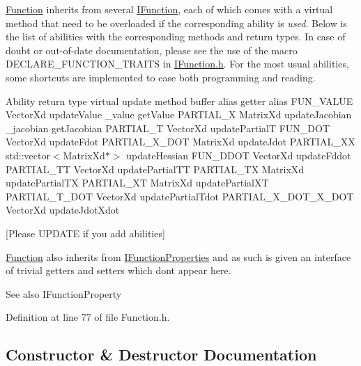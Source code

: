 \hyperlink{classocra_1_1Function}{Function} inherits from several \hyperlink{classocra_1_1IFunction}{I\+Function}, each of which comes with a virtual method that need to be overloaded if the corresponding ability is {\itshape used}. Below is the list of abilities with the corresponding methods and return types. In case of doubt or out-\/of-\/date documentation, please see the use of the macro D\+E\+C\+L\+A\+R\+E\+\_\+\+F\+U\+N\+C\+T\+I\+O\+N\+\_\+\+T\+R\+A\+I\+TS in \hyperlink{IFunction_8h}{I\+Function.\+h}. For the most usual abilities, some shortcuts are implemented to ease both programming and reading.

Ability return type virtual update method buffer alias getter alias F\+U\+N\+\_\+\+V\+A\+L\+UE Vector\+Xd update\+Value \+\_\+value get\+Value P\+A\+R\+T\+I\+A\+L\+\_\+X Matrix\+Xd update\+Jacobian \+\_\+jacobian get\+Jacobian P\+A\+R\+T\+I\+A\+L\+\_\+T Vector\+Xd update\+PartialT F\+U\+N\+\_\+\+D\+OT Vector\+Xd update\+Fdot P\+A\+R\+T\+I\+A\+L\+\_\+\+X\+\_\+\+D\+OT Matrix\+Xd update\+Jdot P\+A\+R\+T\+I\+A\+L\+\_\+\+XX std\+::vector$<$\+Matrix\+Xd$\ast$$>$ update\+Hessian F\+U\+N\+\_\+\+D\+D\+OT Vector\+Xd update\+Fddot P\+A\+R\+T\+I\+A\+L\+\_\+\+TT Vector\+Xd update\+Partial\+TT P\+A\+R\+T\+I\+A\+L\+\_\+\+TX Matrix\+Xd update\+Partial\+TX P\+A\+R\+T\+I\+A\+L\+\_\+\+XT Matrix\+Xd update\+Partial\+XT P\+A\+R\+T\+I\+A\+L\+\_\+\+T\+\_\+\+D\+OT Vector\+Xd update\+Partial\+Tdot P\+A\+R\+T\+I\+A\+L\+\_\+\+X\+\_\+\+D\+O\+T\+\_\+\+X\+\_\+\+D\+OT Vector\+Xd update\+Jdot\+Xdot

\mbox{[}Please U\+P\+D\+A\+TE if you add abilities\mbox{]}

\hyperlink{classocra_1_1Function}{Function} also inherits from \hyperlink{classocra_1_1IFunctionProperties}{I\+Function\+Properties} and as such is given an interface of trivial getters and setters which don\textquotesingle{}t appear here. \begin{DoxySeeAlso}{See also}
I\+Function\+Property 
\end{DoxySeeAlso}


Definition at line 77 of file Function.\+h.



\subsection{Constructor \& Destructor Documentation}
